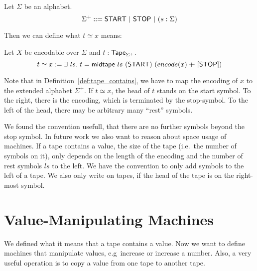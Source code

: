 \begin{definition}[$\Sigma^+$] Let $\Sigma$ be an alphabet.
  \[
    \Sigma^+ ::= \textsf{START} ~|~ \textsf{STOP} ~|~ (s: \Sigma)
  \]
\end{definition}

Then we can define what $t \simeq x$ means:

\begin{definition}[$t \simeq x$]
  \label{def:tape_contains}
  Let $X$ be encodable over $\Sigma$ and $t : \textsf{Tape}_{\Sigma^+}$.
  \[
    t \simeq x := \exists~ls.~
    t = \textsf{midtape}~ls~(\textsf{START})~(encode(x) \mathbin{+\mkern-10mu+} [\textsf{STOP}])
  \]
\end{definition}

Note that in Definition~\ref{def:tape_contains}, we have to map the encoding of $x$ to the extended alphabet $\Sigma^+$.  If $t \simeq x$, the head of
$t$ stands on the start symbol.  To the right, there is the encoding, which is terminated by the stop-symbol.  To the left of the head, there may be
arbitrary many ``rest'' symbols.

We found the convention usefull, that there are no further symbols beyond the stop symbol.  In future work we also want to reason about space usage of
machines.  If a tape contains a value, the size of the tape (i.e.\ the number of symbols on it), only depends on the length of the encoding and the
number of rest symbols $ls$ to the left.  We have the convention to only add symbols to the left of a tape.  We also only write on tapes, if the head
of the tape is on the right-most symbol.

\section{Value-Manipulating Machines}
\label{sec:value-manipulate}


We defined what it means that a tape contains a value.  Now we want to define machines that manipulate values, e.g\ increase or increase a number.
Also, a very useful operation is to copy a value from one tape to another tape.


\todo{}








